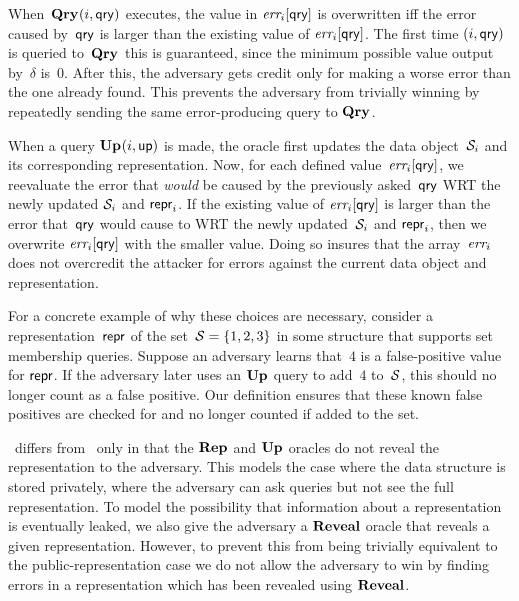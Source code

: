 When~$\textup{\textbf{Qry}}\hspace{0.5pt}(i,\mathsf{qry})$ executes, the value in $\textit{err}_i[\mathsf{qry}]$ is overwritten iff
the error caused by~$\mathsf{qry}$ is larger than the existing value of $\textit{err}_i[\mathsf{qry}]$.
The first time $(i,\mathsf{qry})$ is queried to~$\textup{\textbf{Qry}}\hspace{0.5pt}$ this is guaranteed, since the
minimum possible value output by~$\delta$ is~$0$. After this, the adversary gets
credit only for making a worse error than the one already found. This prevents
the adversary from trivially winning by repeatedly sending the same
error-producing query to $\textup{\textbf{Qry}}\hspace{0.5pt}$.

When a query $\textup{\textbf{Up}}\hspace{0.5pt}(i,\mathsf{up})$ is made, the oracle first updates the data
object~$\mathcal{S}_i$ and its corresponding representation.
%
Now, for each defined value~$\textit{err}_i[\mathsf{qry}]$, we reevaluate the error that
\emph{would} be caused by the previously asked~$\mathsf{qry}$ WRT the newly updated
$\mathcal{S}_i$ and $\mathsf{repr}_i$. If the existing value of $\textit{err}_i[\mathsf{qry}]$ is larger than
the error that~$\mathsf{qry}$ would cause to WRT the newly updated~$\mathcal{S}_i$ and
$\mathsf{repr}_i$, then we overwrite $\textit{err}_i[\mathsf{qry}]$ with the smaller value.  Doing so
insures that the array~$\textit{err}_i$ does not overcredit the attacker for errors
against the current data object and representation.

For a concrete example of why these choices are necessary, consider a
representation~$\mathsf{repr}$ of the set~$\mathcal{S} = \{1,2,3\}$ in some structure that
supports set membership queries. Suppose an adversary learns that~$4$ is a
false-positive value for $\mathsf{repr}$. If the adversary later uses an $\textup{\textbf{Up}}\hspace{0.5pt}$ query to
add~$4$ to~$\mathcal{S}$, this should no longer count as a false positive. Our
definition ensures that these known false positives are checked for and no
longer counted if added to the set.

\erreps\ differs from \errep\ only in that the $\textup{\textbf{Rep}}\hspace{0.5pt}$ and $\textup{\textbf{Up}}\hspace{0.5pt}$ oracles do not
reveal the representation to the adversary. This models the case where the data
structure is stored privately, where the adversary can ask queries but not see
the full representation. To model the possibility that information about a
representation is eventually leaked, we also give the adversary a $\mathbf{Reveal}$ oracle
that reveals a given representation. However, to prevent this from being
trivially equivalent to the public-representation case we do not allow the
adversary to win by finding errors in a representation which has been revealed
using $\mathbf{Reveal}$.

